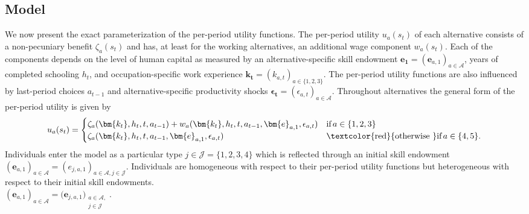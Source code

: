\subsection{Model}\label{Appendix model}
We now present the exact parameterization of the per-period utility functions. The per-period utility $u_a(s_t)$ of each alternative consists of a non-pecuniary benefit $\zeta_a(s_t)$ and has, at least for the working alternatives, an additional wage component $w_a(s_t)$. Each of the components depends on the level of human capital as measured by an alternative-specific skill endowment $\bm{e_1} = \left(\bm{e}_{a,1}\right)_{a\in\mathcal{A}}$, years of completed schooling $h_t$, and occupation-specific work experience $\bm{k_t} = \left(k_{a,t}\right)_{a\in\{1, 2, 3\}}$. The per-period utility functions are also influenced by last-period choices $a_{t -1}$ and alternative-specific productivity shocks $\bm{\epsilon_t} = \left(\epsilon_{a,t}\right)_{a\in\mathcal{A}}$. Throughout alternatives the general form of the per-period utility is given by
\begin{align*}
u_a(s_t) =
\begin{cases}
    \zeta_a(\bm{k_t}, h_t, t, a_{t -1})  + w_a(\bm{k_t}, h_t, t, a_{t -1}, \bm{e}_{a,1}, \epsilon_{a,t})              & \text{if}\, a \in \{1, 2, 3\}  \\
    \zeta_a(\bm{k_t}, h_t, t, a_{t-1}, \bm{e}_{a,1}, \epsilon_{a,t})                                    & \text{\textcolor{red}{otherwise }} \text{if}\, a \in \{4, 5\}.
\end{cases}
\end{align*}
Individuals enter the model as a particular type $j \in \mathcal{J} = \{1, 2, 3, 4\}$ which is reflected through an initial skill endowment $\left(\bm{e}_{a,1}\right)_{a\in\mathcal{A}} = \left(e_{j,a,1}\right)_{a\in\mathcal{A}, j \in \mathcal{J}}$. Individuals are homogeneous with respect to their per-period utility functions but heterogeneous with respect to their initial skill endowments. 
\vspace{20pt} \\
$\left(\bm{e}_{a,1}\right)_{a\in\mathcal{A}} = \Big( \bm{e}_{j,a,1} \Big)_{\substack{a\in\mathcal{A}, \\ j \in \mathcal{J} }}$.

